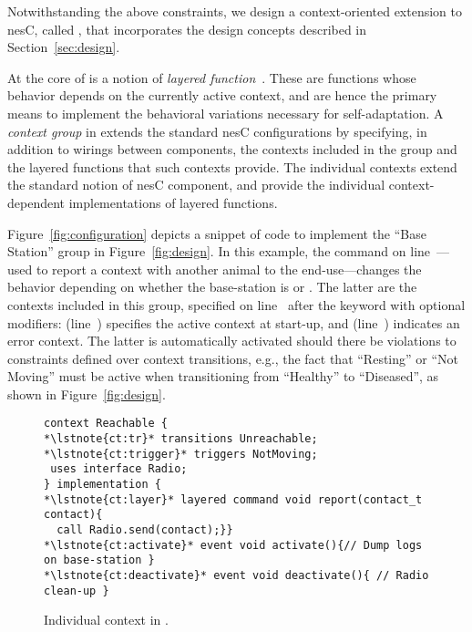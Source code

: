 \fakepar{\conesc} Notwithstanding the above constraints, we design a
context-oriented extension to nesC, called \conesc, that incorporates
the design concepts described in Section~\ref{sec:design}. 

At the core of \conesc is a notion of \emph{layered
  function}~\cite{Hirschfeld08}. These are functions whose behavior
depends on the currently active context, and are hence the primary
means to implement the behavioral variations necessary for
self-adaptation. A \emph{context group} in \conesc extends the
standard nesC configurations by specifying, in addition to wirings
between components, the contexts included in the group and the layered
functions that such contexts provide. The individual contexts extend
the standard notion of nesC component, and provide the individual
context-dependent implementations of layered functions.

Figure~\ref{fig:configuration} depicts a snippet of \conesc code to
implement the ``Base Station'' group in Figure~\ref{fig:design}. In
this example, the  command on
line~---used to report a context with another animal
to the end-use---changes the behavior depending on whether the
base-station is  or . The latter are
the contexts included in this group, specified on line~
after the keyword  with optional modifiers:  (line~) specifies the active context at
start-up, and  (line~) indicates an
error context. The latter is automatically activated should there be
violations to constraints defined over context transitions, e.g., the
fact that ``Resting'' or ``Not Moving'' must be active when
transitioning from ``Healthy'' to ``Diseased'', as shown in
Figure~\ref{fig:design}.

\begin{figure}[!tb]
\begin{lstlisting}[style=conescframe]
context Reachable {
*\lstnote{ct:tr}* transitions Unreachable;
*\lstnote{ct:trigger}* triggers NotMoving;
 uses interface Radio;
} implementation {
*\lstnote{ct:layer}* layered command void report(contact_t contact){
  call Radio.send(contact);}}
*\lstnote{ct:activate}* event void activate(){// Dump logs on base-station }
*\lstnote{ct:deactivate}* event void deactivate(){ // Radio clean-up }
\end{lstlisting}
\vspace{-4mm}
\caption{Individual context in \conesc.}
  \label{fig:context}
\vspace{-4mm}
\end{figure}

